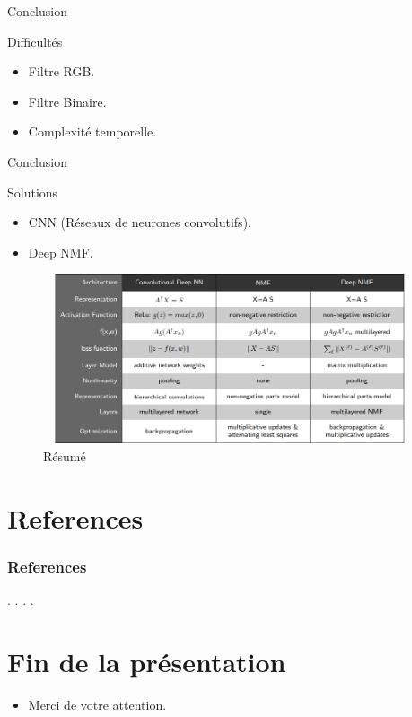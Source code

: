 \documentclass{beamer}
\begin{document}
\begin{frame}{Conclusion}
\begin{block}{Difficultés}
\begin{itemize}
\item Filtre RGB.
\item Filtre Binaire.
\item Complexité temporelle.
\end{itemize}
\end{block}
\end{frame}

\begin{frame}{Conclusion}
\begin{block}{Solutions}
\begin{itemize}
\item CNN (Réseaux de neurones convolutifs).
\item Deep NMF. 
\end{itemize}
\begin{figure}
\includegraphics[width=11cm ,height= 5cm]{final_screen.png}
\caption{\label{fig:your-figure}Résumé}
\end{figure}
\end{block}

\end{frame}

\section{References}
\begin{frame}
\frametitle{References}
 

\begin{itemize}
\cite{Lee2001}
\cite{wild}.
\cite{nadif}.
\cite{final}.
\cite{deepnmf}.
\end{itemize}
\end{frame}

\section{Fin de la présentation}
\begin{frame}
\begin{itemize}[<+-| alert@+>]
\item Merci de votre attention.
\end{itemize}
\end{frame}
\end{document}
